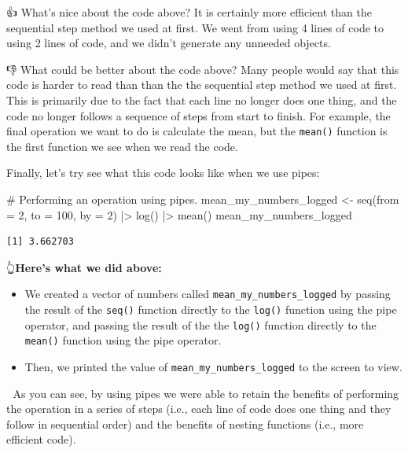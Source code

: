 \documentclass[
  letterpaper,
  DIV=11,
  numbers=noendperiod]{scrreprt}
\newenvironment{Shaded}{\begin{snugshade}}{\end{snugshade}}
\newcommand{\AttributeTok}[1]{\textcolor[rgb]{0.40,0.45,0.13}{#1}}
\newcommand{\CommentTok}[1]{\textcolor[rgb]{0.37,0.37,0.37}{#1}}
\newcommand{\DecValTok}[1]{\textcolor[rgb]{0.68,0.00,0.00}{#1}}
\newcommand{\FunctionTok}[1]{\textcolor[rgb]{0.28,0.35,0.67}{#1}}
\newcommand{\NormalTok}[1]{\textcolor[rgb]{0.00,0.23,0.31}{#1}}
\newcommand{\OtherTok}[1]{\textcolor[rgb]{0.00,0.23,0.31}{#1}}
\newcommand{\SpecialCharTok}[1]{\textcolor[rgb]{0.37,0.37,0.37}{#1}}
\begin{document}
👍 What's nice about the code above? It is certainly more efficient than
the sequential step method we used at first. We went from using 4 lines
of code to using 2 lines of code, and we didn't generate any unneeded
objects.

👎 What could be better about the code above? Many people would say that
this code is harder to read than than the the sequential step method we
used at first. This is primarily due to the fact that each line no
longer does one thing, and the code no longer follows a sequence of
steps from start to finish. For example, the final operation we want to
do is calculate the mean, but the \texttt{mean()} function is the first
function we see when we read the code.

Finally, let's try see what this code looks like when we use pipes:

\begin{Shaded}
\begin{Highlighting}[]
\CommentTok{\# Performing an operation using pipes.}
\NormalTok{mean\_my\_numbers\_logged }\OtherTok{\textless{}{-}} \FunctionTok{seq}\NormalTok{(}\AttributeTok{from =} \DecValTok{2}\NormalTok{, }\AttributeTok{to =} \DecValTok{100}\NormalTok{, }\AttributeTok{by =} \DecValTok{2}\NormalTok{) }\SpecialCharTok{|\textgreater{}} 
  \FunctionTok{log}\NormalTok{() }\SpecialCharTok{|\textgreater{}} 
  \FunctionTok{mean}\NormalTok{()}
\NormalTok{mean\_my\_numbers\_logged}
\end{Highlighting}
\end{Shaded}

\begin{verbatim}
[1] 3.662703
\end{verbatim}

👆\textbf{Here's what we did above:}

\begin{itemize}
\item
  We created a vector of numbers called
  \texttt{mean\_my\_numbers\_logged} by passing the result of the
  \texttt{seq()} function directly to the \texttt{log()} function using
  the pipe operator, and passing the result of the the \texttt{log()}
  function directly to the \texttt{mean()} function using the pipe
  operator.
\item
  Then, we printed the value of \texttt{mean\_my\_numbers\_logged} to
  the screen to view.
\end{itemize}

👏 As you can see, by using pipes we were able to retain the benefits of
performing the operation in a series of steps (i.e., each line of code
does one thing and they follow in sequential order) and the benefits of
nesting functions (i.e., more efficient code).
\end{document}
